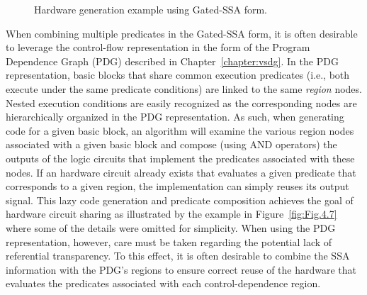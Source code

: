 \begin{figure}[htbp]
  \centering
  \hfill
\caption{Hardware generation example using Gated-SSA form.}
\label{fig:Fig.4.6}
\end{figure}
When combining multiple predicates in the Gated-SSA form, it is often desirable to leverage the control-flow representation in the form of the Program Dependence Graph (PDG) described in Chapter~\ref{chapter:vsdg}. 
In the PDG representation, basic blocks that share common execution predicates (i.e., both execute under the same predicate conditions) are linked to the same {\em region} nodes. 
Nested execution conditions are easily recognized as the corresponding nodes are hierarchically organized in the PDG representation. 
As such, when generating code for a given basic block, an algorithm will examine the various region nodes associated with a given basic block and compose (using AND operators) the outputs of the logic circuits that implement the predicates associated with these nodes. 
If an hardware circuit already exists that evaluates a given predicate that corresponds to a given region, the implementation can simply reuses its output signal.  
This lazy code generation and predicate composition achieves the goal of hardware circuit sharing as illustrated by the example in Figure~\ref{fig:Fig.4.7} where some of the details were omitted for simplicity.
When using the PDG representation, however, care must be taken regarding the potential lack of referential transparency. To this effect, it is often desirable to combine the SSA information with the PDG's regions to ensure correct reuse of the hardware that evaluates the predicates associated with each control-dependence region.

